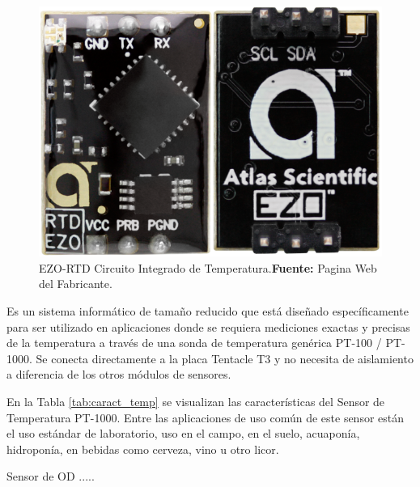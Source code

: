 \begin{figure}[ht]
    \centering
    \includegraphics[scale=0.4]{Imagenes/2021/imag38.png}
    \caption[EZO-RTD Circuito Integrado de Temperatura]{EZO-RTD Circuito Integrado de Temperatura.\textbf{Fuente: }Pagina Web del Fabricante.}
    \label{fig:4.16}
\end{figure}

Es un sistema informático de tamaño reducido que está diseñado específicamente para ser utilizado en aplicaciones donde se requiera mediciones exactas y precisas de la temperatura a través de una sonda de temperatura genérica PT-100 / PT-1000. Se conecta directamente a la placa Tentacle T3 y no necesita de aislamiento a diferencia de los otros módulos de sensores.

En la Tabla \ref{tab:caract_temp} se visualizan las características del Sensor de Temperatura PT-1000.
Entre las aplicaciones de uso común de este sensor están el uso est\'andar de laboratorio, uso en el campo, en el suelo, acuapon\'ia, hidroponía, en bebidas como cerveza, vino u otro licor.

Sensor de OD .....

